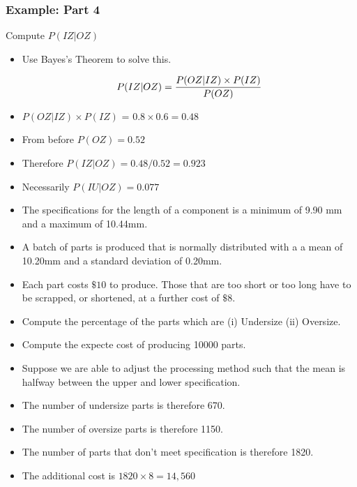 ﻿\documentclass[a4]{beamer}
\begin{document}
\begin{frame}
\frametitle{Example: Part 4}
Compute $P(IZ|OZ)$ 
\begin{itemize}
\item Use Bayes's Theorem to solve this.

\[P(IZ|OZ) = {P(OZ|IZ)\times P(IZ)\over P(OZ)} \]

\item $P(OZ|IZ)\times P(IZ)$ = $0.8 \times 0.6 = 0.48$

\item From before $P(OZ) = 0.52$

\item Therefore $P(IZ|OZ) = 0.48 / 0.52 = \boldsymbol{0.923}$

\item Necessarily $P(IU|OZ)  = 0.077$
\end{itemize}
\end{frame}
\begin{frame}
\begin{itemize}
\item The specifications for the length of a component is a minimum of 9.90 mm  and a maximum of 10.44mm.

\item A batch of parts is produced that is normally distributed with a a mean of 10.20mm and a standard deviation of 0.20mm.

\item Each part costs $\$10$ to produce. Those that are too short or too long have to be scrapped, or shortened, at a further cost of $\$8$.

\item Compute the percentage of the parts which are (i) Undersize (ii) Oversize.

\item Compute the expecte cost of producing 10000 parts.

\item Suppose we are able to adjust the processing method such that the mean is halfway between the upper and lower specification.
\end{itemize}
\end{frame}


\begin{frame}
\begin{itemize}
\item The number of undersize parts is therefore 670.
\item The number of oversize parts is therefore 1150.
\item The number of parts that don't meet specification is therefore 1820.
\item The additional cost is $1820 \times 8 = 14,560$
\end{itemize}
\end{frame}
\end{document}
